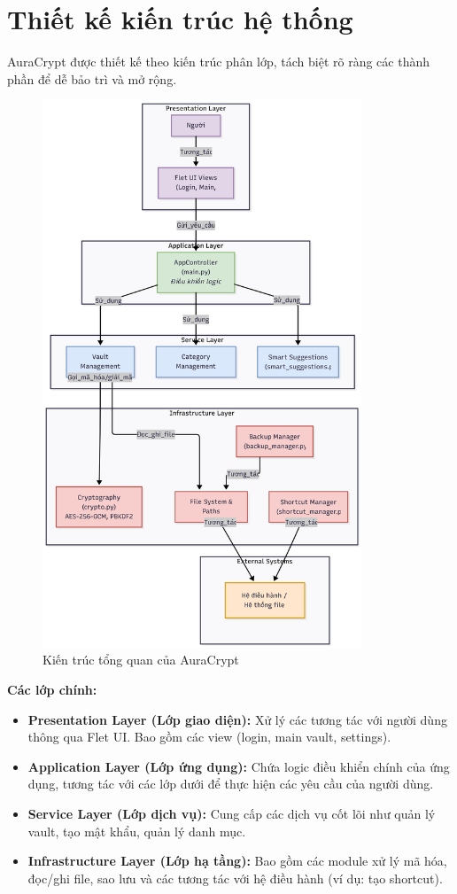 \section{Thiết kế kiến trúc hệ thống}
AuraCrypt được thiết kế theo kiến trúc phân lớp, tách biệt rõ ràng các thành phần để dễ bảo trì và mở rộng.

\begin{figure}[H]
    \centering
    \includegraphics[width=0.85\textwidth]{images/architecture_diagram.png}
    \caption{Kiến trúc tổng quan của AuraCrypt}
    \label{fig:architecture_diagram}
\end{figure}
\textbf{Các lớp chính:}
\begin{itemize}
    \item \textbf{Presentation Layer (Lớp giao diện):} Xử lý các tương tác với người dùng thông qua Flet UI. Bao gồm các view (login, main vault, settings).
    \item \textbf{Application Layer (Lớp ứng dụng):} Chứa logic điều khiển chính của ứng dụng, tương tác với các lớp dưới để thực hiện các yêu cầu của người dùng.
    \item \textbf{Service Layer (Lớp dịch vụ):} Cung cấp các dịch vụ cốt lõi như quản lý vault, tạo mật khẩu, quản lý danh mục.
    \item \textbf{Infrastructure Layer (Lớp hạ tầng):} Bao gồm các module xử lý mã hóa, đọc/ghi file, sao lưu và các tương tác với hệ điều hành (ví dụ: tạo shortcut).
\end{itemize}

